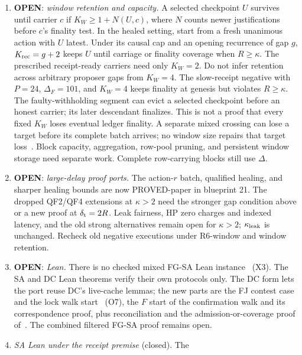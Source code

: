 \documentclass{article}
\theoremstyle{plain}
\theoremstyle{definition}
\theoremstyle{remark}
\newcommand{\LDP}[1]{\cite[\S#1]{LDP}}
\newcommand{\OPEN}{\textbf{OPEN}}
\begin{document}
\begin{enumerate}[leftmargin=*]
  removed by capacity, the union keeps only that earlier read.  Thus the
  union stays below quorum and keeps the strict size bound.  Its fairness
  benefit for $\kappa>2$ needs a proof.  This option is not adopted;
  Figure~\ref{alg:leak} keeps the first-replacement read.
\item \OPEN: \emph{window retention and capacity.}
  A selected checkpoint $U$ survives until carrier $c$ if
  $K_W\geq1+N(U,c)$, where $N$ counts newer justifications before $c$'s
  finality test.  In the healed setting, start from a fresh unanimous
  action with $U$ latest.  Under its causal cap and an opening recurrence
  of gap $g$, $K_{\rm rec}=g+2$ keeps $U$ until carriage or finality
  coverage when $R\geq\kappa$.  The prescribed receipt-ready carriers need only $K_W=2$.
  Do not infer retention across arbitrary proposer gaps from $K_W=4$.
  The slow-receipt negative with $P=24$, $\Delta_F=101$, and $K_W=4$
  keeps finality at genesis but violates $R\geq\kappa$.
  The faulty-withholding segment can evict a selected checkpoint
  before an honest carrier; its later descendant finalizes.  This is
  not a proof that every fixed $K_W$ loses eventual ledger finality.
  A separate mixed crossing can lose a target before its complete
  batch arrives; no window size repairs that target loss~\cite[\S3]{FW}.
  Block capacity, aggregation, row-pool pruning, and persistent window
  storage need separate work.  Complete row-carrying blocks still use $\Delta$.
\item \OPEN: \emph{large-delay proof ports.}
  The action-$r$ batch, qualified healing, and sharper healing bounds
  are now PROVED-paper in blueprint 21.  The dropped QF2/QF4 extensions at $\kappa>2$ need the stronger gap condition
  above or a new proof at $\delta_{\rm t}=2R$.
  Leak fairness, HP zero charges and indexed latency, and the old strong
  alternatives remain open for $\kappa>2$; $\kappa_{\rm leak}$ is unchanged.
  Recheck old negative executions under R6-window and window retention.
\item \OPEN: \emph{Lean.}  There is no checked mixed FG-SA Lean
  instance~\LDP{7} (X3).  The SA and DC Lean
  theorems verify their own protocols only.  The DC form lets the port
  reuse DC's live-cache lemmas; the new parts are the FJ contest case and
  the lock walk start~\LDP{7} (O7), the $F$ start of the confirmation
  walk and its correspondence proof, plus reconciliation and the
  admission-or-coverage proof of~\cite[\S\S2--7]{FB}.  The combined
  filtered FG-SA proof remains open.
\item \emph{SA Lean under the receipt premise} (closed).  The

\end{enumerate}
\end{document}

